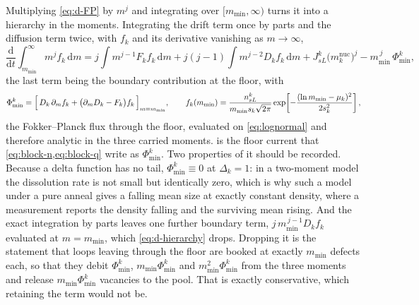 Multiplying \cref{eq:d-FP} by $m^{j}$ and integrating over $[m_{\min},\infty)$
turns it into a hierarchy in the moments. Integrating the drift term once by
parts and the diffusion term twice, with $f_k$ and its derivative vanishing as
$m\to\infty$,
\begin{equation}
  \frac{\mathrm d}{\mathrm dt}\!\int_{m_{\min}}^{\infty}\!\!m^{j}f_k\,\mathrm dm
  =j\!\int\!m^{j-1}F_kf_k\,\mathrm dm
   +j(j-1)\!\int\!m^{j-2}D_kf_k\,\mathrm dm
   +J^k_{sL}\bigl(m^{\mathrm{nuc}}_k\bigr)^{j}
   -m_{\min}^{\,j}\,\Phi^k_{\min},
  \label{eq:d-hierarchy}
\end{equation}
the last term being the boundary contribution at the floor, with
\begin{equation}
  \Phi^k_{\min}
   =\Bigl[\,D_k\,\partial_mf_k+\bigl(\partial_mD_k-F_k\bigr)f_k\,\Bigr]_{m=m_{\min}},
  \qquad
  f_k(m_{\min})=\frac{n^k_{sL}}{m_{\min}s_k\sqrt{2\pi}}
    \exp\!\left[-\frac{(\ln m_{\min}-\mu_k)^{2}}{2s_k^{2}}\right],
  \label{eq:d-floorcurrent}
\end{equation}
the Fokker--Planck flux through the floor, evaluated on \cref{eq:lognormal} and
therefore analytic in the three carried moments.  is the
floor current that \cref{eq:block-n,eq:block-q} write as $\Phi^k_{\min}$. Two
properties of it should be recorded. Because a delta function has no tail,
$\Phi^k_{\min}\equiv0$ at $\Delta_k=1$: in a two-moment model the dissolution
rate is not small but identically zero, which is why such a model under a pure
anneal gives a falling mean size at exactly constant density, where a measurement
reports the density falling and the surviving mean rising. And the exact
integration by parts leaves one further boundary term,
$j\,m_{\min}^{\,j-1}D_kf_k$ evaluated at $m=m_{\min}$, which
\cref{eq:d-hierarchy} drops. Dropping it is the statement that loops leaving
through the floor are booked at exactly $m_{\min}$ defects each, so that they
debit $\Phi^k_{\min}$, $m_{\min}\Phi^k_{\min}$ and $m_{\min}^{2}\Phi^k_{\min}$
from the three moments and release $m_{\min}\Phi^k_{\min}$ vacancies to the
pool. That is exactly conservative, which retaining the term would not be.

